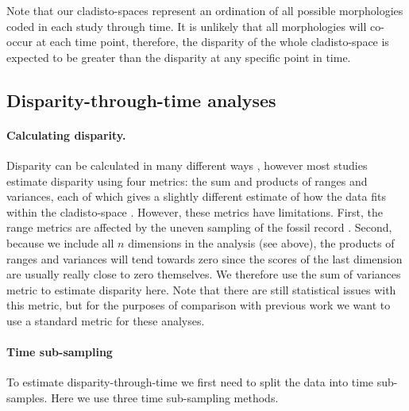 \documentclass[12pt,a4paper]{article}
\begin{document}
Note that our cladisto-spaces represent an ordination of all possible morphologies coded in each study through time.
It is unlikely that all morphologies will co-occur at each time point, therefore, the disparity of the whole cladisto-space is expected to be greater than the disparity at any specific point in time.

\subsection{Disparity-through-time analyses}

\paragraph{Calculating disparity.}
\label{disparity_calc}
Disparity can be calculated in many different ways \citep[e.g.][]{Wills1994,Ciampaglio2004,thorneresetting2011,hopkinsdecoupling2013,huang2015origins}, however most studies estimate disparity using four metrics: the sum and products of ranges and variances, each of which gives a slightly different estimate of how the data fits within the cladisto-space \citep{Foote01071994,Wills1994,brusatte50,Brusatte12092008,cisneros2010,thorneresetting2011,prentice2011,brusattedinosaur2012,toljagictriassic-jurassic2013,ruta2013,bentonmodels2014,bensonfaunal2014}.
However, these metrics have limitations. 
First, the range metrics are affected by the uneven sampling of the fossil record \citep{Butler2012}.
Second, because we include all $n$ dimensions in the analysis (see above), the products of ranges and variances will tend towards zero since the scores of the last dimension are usually really close to zero themselves. 
We therefore use the sum of variances metric to estimate disparity here.
Note that there are still statistical issues with this metric, but for the purposes of comparison with previous work we want to use a standard metric for these analyses.

\paragraph{Time sub-sampling} 
\label{time_sub-samples}

To estimate disparity-through-time we first need to split the data into time sub-samples.
Here we use three time sub-sampling methods.
\end{document}
